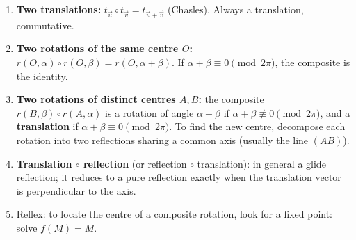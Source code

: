 \documentclass[11pt]{article}
\newcommand{\cle}[1]{{\popxbold\color{popdark}#1}}
\begin{document}
\begin{methode}
\begin{enumerate}
\item \textbf{Two translations:} $t_{\vec{u}} \circ t_{\vec{v}} = t_{\vec{u}+\vec{v}}$ (Chasles). Always a translation, commutative.
\item \textbf{Two rotations of the same centre $O$:} $r(O,\alpha) \circ r(O,\beta) = r(O, \alpha+\beta)$. If $\alpha + \beta \equiv 0 \pmod{2\pi}$, the composite is the identity.
\item \textbf{Two rotations of distinct centres $A, B$:} the composite $r(B,\beta) \circ r(A,\alpha)$ is a rotation of angle $\alpha + \beta$ if $\alpha + \beta \not\equiv 0 \pmod{2\pi}$, and a \textbf{translation} if $\alpha + \beta \equiv 0 \pmod{2\pi}$. To find the new centre, decompose each rotation into two reflections sharing a common axis (usually the line $(AB)$).
\item \textbf{Translation $\circ$ reflection} (or reflection $\circ$ translation): in general a \cle{glide reflection}; it reduces to a pure reflection exactly when the translation vector is perpendicular to the axis.
\item Reflex: to locate the centre of a composite rotation, look for a fixed point: solve $f(M) = M$.
\end{enumerate}
\end{methode}
\end{document}
